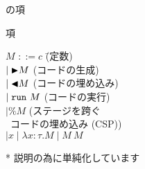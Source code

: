 \documentclass[dvipdfmx,aspectratio=169, 20pt]{beamer}
\begin{document}




\begin{frame}[fragile]{\LMD の項}
    \begin{block}{項}
        \begin{tabbing}
            \hspace{5mm} \( M \) \= \( ::= c \) \hspace{20mm} \= (定数) \\
            \> \( \mid {\mathop{\blacktriangleright}} M \) \> (コードの生成) \\
            \> \( \mid {\mathop{\blacktriangleleft}} M \) \> (コードの埋め込み) \\
            \> \( \mid \verb|run|\ M \) \> (コードの実行) \\
            \> \( \mid \% M \) \> (ステージを跨ぐ \\
            \> \> \ コードの埋め込み (CSP)) \\
            \> \( \mid x \mid \lambda x:\tau.M \mid M\ M \)
        \end{tabbing}
    \end{block}
    * 説明の為に単純化しています
\end{frame}
\end{document}
